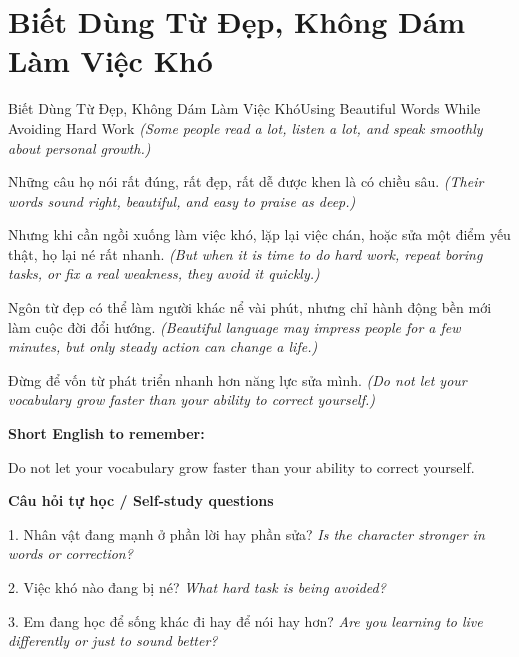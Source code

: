 \section{Biết Dùng Từ Đẹp, Không Dám Làm Việc Khó}
\begin{truyen}{Biết Dùng Từ Đẹp, Không Dám Làm Việc Khó}{Using Beautiful Words While Avoiding Hard Work}
\textit{(Some people read a lot, listen a lot, and speak smoothly about personal growth.)}

Những câu họ nói rất đúng, rất đẹp, rất dễ được khen là có chiều sâu.
\textit{(Their words sound right, beautiful, and easy to praise as deep.)}

Nhưng khi cần ngồi xuống làm việc khó, lặp lại việc chán, hoặc sửa một điểm yếu thật, họ lại né rất nhanh.
\textit{(But when it is time to do hard work, repeat boring tasks, or fix a real weakness, they avoid it quickly.)}

Ngôn từ đẹp có thể làm người khác nể vài phút, nhưng chỉ hành động bền mới làm cuộc đời đổi hướng.
\textit{(Beautiful language may impress people for a few minutes, but only steady action can change a life.)}

\end{truyen}

\begin{baihoc}
Đừng để vốn từ phát triển nhanh hơn năng lực sửa mình.
\textit{(Do not let your vocabulary grow faster than your ability to correct yourself.)}
\end{baihoc}

\begin{ghinhoanh}
\textbf{Short English to remember:}

Do not let your vocabulary grow faster than your ability to correct yourself.

\end{ghinhoanh}

\begin{tuhocnhanh}
\textbf{Câu hỏi tự học / Self-study questions}

1. Nhân vật đang mạnh ở phần lời hay phần sửa? \textit{Is the character stronger in words or correction?}

2. Việc khó nào đang bị né? \textit{What hard task is being avoided?}

3. Em đang học để sống khác đi hay để nói hay hơn? \textit{Are you learning to live differently or just to sound better?}
\end{tuhocnhanh}
\ngancach

